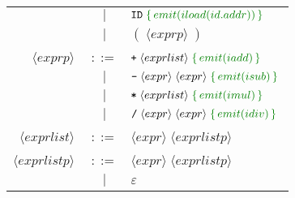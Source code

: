 \documentclass[a4paper]{article}
\newcommand{\cmd}[1]{\textcolor{MyGreen}{\{\, #1 \,\}} \;}
\newcommand{\node}[1]{\langle #1 \rangle \;}
\newcommand{\tag}[1]{\texttt{#1} \;}
\begin{document}
\begin{center}
\begin{tabular}{ r c l }
                      &  $|$  & $\tag{ID} \cmd{emit(iload(id.addr))}$ \\

                      &  $|$  & $(\; \node{exprp} )$ \\\\
  $\node{exprp}$      & $::=$ & $\texttt{+}\; \node{exprlist} \cmd{emit(iadd)}$ \\
                      &  $|$  & $\texttt{-}\; \node{expr} \node{expr} \cmd{emit(isub)}$ \\
                      &  $|$  & $\texttt{*}\; \node{exprlist} \cmd{emit(imul)}$ \\
                      &  $|$  & $\texttt{/}\; \node{expr} \node{expr} \cmd{emit(idiv)}$ \\\\
  $\node{exprlist}$   & $::=$ & $\node{expr} \node{exprlistp}$ \\\\
  $\node{exprlistp}$  & $::=$ & $\node{expr} \node{exprlistp}$ \\

                      &  $|$  & $\varepsilon$
\end{tabular}
\end{center}
\end{document}
